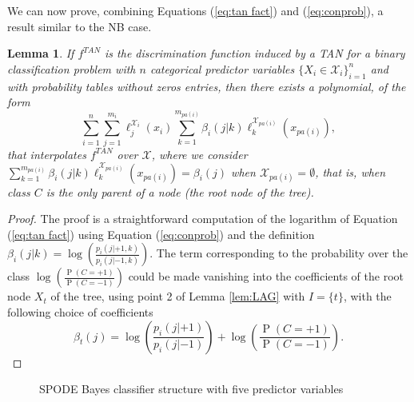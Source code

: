 \documentclass[11pt,a4paper, twoside]{book}
\newtheorem{lemma}{Lemma}[chapter]
\newcommand{\Pp}{\operatorname{P}}
\newcommand{\bchi}{\boldsymbol{\mathcal{X}}}
\newcommand{\nchi}{\mathcal{X}}
\begin{document}
We can now prove, combining Equations (\ref{eq:tan fact}) and (\ref{eq:conprob}), a result similar to the NB case.
\begin{lemma}
\label{lem:TANteo}
If $f^{TAN}$ is the discrimination function induced by a TAN for a binary classification problem with $n$ categorical predictor variables $\{X_i \in \nchi_i \}_{i=1}^n${ and  with probability tables without zeros entries}, then there exists a polynomial, of the form 
\[ \sum_{i=1}^{n}  \sum_{j=1}^{m_i} \ell_{j}^{\nchi_i}(x_i) \sum_{k=1}^{m_{pa(i)}} \beta_{i}(j|k)\ell_{k}^{\nchi_{pa(i)}}(x_{pa(i)}) ,  \]
that interpolates $f^{TAN}$ over $\bchi$, where we consider $\sum_{k=1}^{m_{pa(i)}} \beta_{i}(j|k)\ell_{k}^{\nchi_{pa(i)}}(x_{pa(i)})=\beta_{i}(j)$  when $\nchi_{pa(i)}=\emptyset$, that is, when class $C$ is the only parent of a node (the root node of the tree).
\end{lemma} 
\begin{proof}
The proof is a straightforward computation of the logarithm of Equation (\ref{eq:tan fact}) using Equation (\ref{eq:conprob}) and the definition  $\beta_{i}(j|k)=\log\left(\frac{p_{i}(j|+1,k)}{p_{i}(j|-1,k)}\right)$. The term corresponding to the probability over the class $\log \left( \frac{\Pp(C=+1)}{\Pp(C=-1)}\right)$ could be made vanishing into the coefficients of the root node $X_t$ of the tree, using point 2 of Lemma \ref{lem:LAG} with $I=\{t\}$, with the following choice of coefficients
$$ \beta_t(j)=\log\left(\frac{p_{i}(j|+1)}{p_{i}(j|-1)}\right)+\log \left( \frac{\Pp(C=+1)}{\Pp(C=-1)}\right).$$
\end{proof}
\begin{figure}
\centering
{}  
\caption{SPODE Bayes classifier structure with five predictor variables}
\label{fig:SPODE}
\end{figure}
\end{document}
